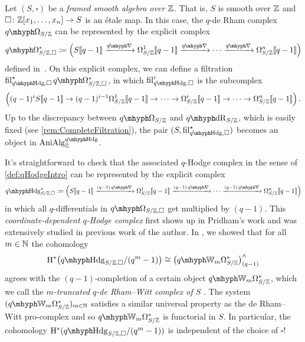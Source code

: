 \documentclass[DIV=12,numbers=enddot,leqno,bibliography=totoc]{scrartcl}
\begin{document}
	\begin{numpar}\label{par:qHodgeFiltrationInCoordinates}
		Let $(S,\square)$ be a \emph{framed smooth algebra over $\mathbb{Z}$}. That is, $S$ is smooth over $\mathbb{Z}$ and $\square \colon \IZ[x_1,\dotsc,x_n]\rightarrow S$ is an étale map. In this case, the $q$-de Rham complex $\qOmega_{S/\IZ}$ can be represented by the explicit complex
		\begin{equation*}
			\qOmega_{S/\IZ,\square}^*\coloneqq\left(S\qpower \xrightarrow{\q\nabla}\Omega_{S/\IZ}^1\qpower\xrightarrow{\q\nabla} \dotsb \xrightarrow{\q\nabla} \Omega^n_{S/\IZ}\qpower \right)
		\end{equation*}
		defined in~\cite[\textup{\S{}}]{Toulouse}. On this explicit complex, we can define a filtration $\fil_{\qHodge,\square}^\star\qOmega_{S/\IZ, \square}^*$, in which $\fil_{\qHodge,\square}^i$ is the subcomplex
		\begin{equation*}
			\left((q-1)^iS\qpower\rightarrow(q-1)^{i-1}\Omega_{S/\IZ}^1\qpower\rightarrow\dotsb\rightarrow\Omega_{S/\IZ}^i\qpower\rightarrow\dotsb\rightarrow\Omega_{S/\IZ}^n\qpower\right)\,.
		\end{equation*}
		Up to the discrepancy between $\qOmega_{S/\IZ}$ and $\qdeRham_{S/\IZ}$, which is easily fixed (see \cref{rem:CompleteFiltration}), the pair $(S,\fil_{\qHodge,\square}^\star)$ becomes an object in $\cat{AniAlg}_\IZ^{\qHodge}$.
		
		It's straightforward to check that the associated $q$-Hodge complex in the sense of \cref{def:qHodgeIntro} can be represented by the explicit complex
		\begin{equation*}
			\qHodge_{S/\IZ, \square}^*\coloneqq\Bigl(S\qpower \xrightarrow{(q-1)\q\nabla}\Omega_{S/\IZ}^1\qpower\xrightarrow{(q-1)\q\nabla} \dotsb \xrightarrow{(q-1)\q\nabla} \Omega^n_{S/\IZ}\qpower \Bigr)
		\end{equation*}
		in which all $q$-differentials in $\qOmega_{S/\IZ,\square}$ get multiplied by $(q-1)$. This \emph{coordinate-dependent $q$-Hodge complex} first shows up in Pridham's work \cite{Pridham} and was extensively studied in previous work of the author. In \cite[Theorem~]{qWitt}, we showed that for all $m\in\mathbb{N}$ the cohomology
		\begin{equation*}
			\H^*\bigl(\qHodge_{S/\IZ,\square}/(q^m-1)\bigr)\cong \bigl(\qIW_m\Omega_{S/\IZ}^*\bigr)_{(q-1)}^\complete
		\end{equation*}
		agrees with the $(q-1)$-completion of a certain object $\qIW_m\Omega_{S/\IZ}^*$, which we call the \emph{$m$-truncated $q$-de Rham--Witt complex of $S$} \cite[Definition~]{qWitt}. The system $(\qIW_m\Omega_{S/\IZ}^*)_{m\in\IN}$ satisfies a similar universal property as the de Rham--Witt pro-complex and so $\qIW_m\Omega_{S/\IZ}^*$ is functorial in $S$. In particular, the cohomology $\H^*(\qHodge_{S/\IZ,\square}/(q^m-1))$ is independent of the choice of $\square$!
		

\end{numpar}
\end{document}
